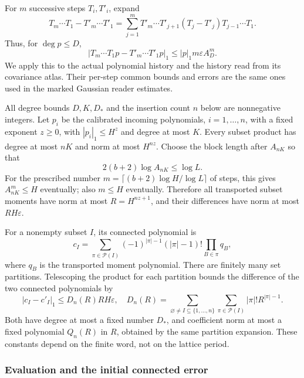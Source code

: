 For $m$ successive steps $T_i,T'_i$, expand
\[
 T_m\cdots T_1-T'_m\cdots T'_1
 =\sum_{j=1}^m T'_m\cdots T'_{j+1}
                   (T_j-T'_j)T_{j-1}\cdots T_1.
\]
Thus, for $\deg p\le D$,
\begin{equation}\label{eq:healthy-transport-telescope}
 |T_m\cdots T_1p-T'_m\cdots T'_1p|_1
                         \le |p|_1 m\varepsilon A_D^m.
\end{equation}
We apply this to the actual polynomial history and the history read
from its covariance atlas. Their per-step common bounds and errors
are the same ones used in the marked Gaussian reader estimates.

All degree bounds $D,K,D_*$ and the insertion count $n$ below are
nonnegative integers. Let $p_i$ be the calibrated incoming polynomials,
$i=1,\ldots,n$, with a fixed exponent $z\ge0$,
with $|p_i|_1\le H^z$ and degree at most $K$. Every subset product
has degree at most $nK$ and norm at most $H^{nz}$. Choose the
block length after $A_{nK}$ so that
\[
              2(b+2)\log A_{nK}\le\log L.
\]
For the prescribed number
$m=\lceil(b+2)\log H/\log L\rceil$ of steps, this gives
$A_{nK}^m\le H$ eventually; also $m\le H$ eventually.
Therefore all transported subset moments have norm at most
$R=H^{nz+1}$, and their differences have norm at most
$RH\varepsilon$.

For a nonempty subset $I$, its connected polynomial is
\[
 c_I=\sum_{\pi\in\mathcal P(I)}
       (-1)^{|\pi|-1}(|\pi|-1)!\prod_{B\in\pi}q_B,
\]
where $q_B$ is the transported moment polynomial. There are finitely
many set partitions. Telescoping the product for each partition
bounds the difference of the two connected polynomials by
\begin{equation}\label{eq:healthy-connected-polynomials}
 |c_I-c'_I|_1\le D_n(R)RH\varepsilon,
 \quad D_n(R)=\sum_{\varnothing\ne I\subseteq\{1,\ldots,n\}}
       \sum_{\pi\in\mathcal P(I)}|\pi|!R^{|\pi|-1}.
\end{equation}
Both have degree at most a fixed number $D_*$, and coefficient norm
at most a fixed polynomial $Q_n(R)$ in $R$, obtained by the same
partition expansion. These constants depend on the finite word,
not on the lattice period.

\subsubsection{Evaluation and the initial connected error}

